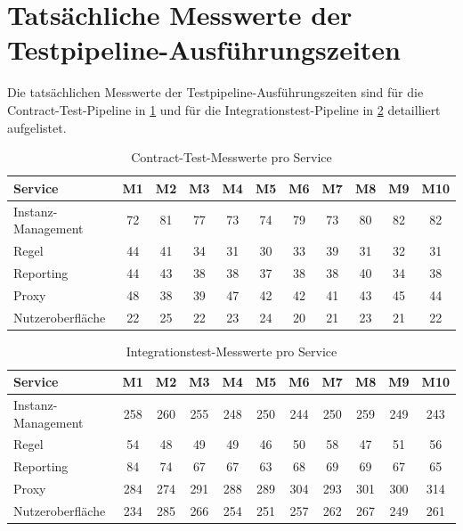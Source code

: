 \section{Tatsächliche Messwerte der Testpipeline-\-Ausführungszeiten}\label{sec:app:test-pipeline-execution-times}

Die tatsächlichen Messwerte der Testpipeline-Ausführungszeiten sind für die Contract-Test-\gls{Pipeline} in \cref{tab:contract_measurements} und für die Integrationstest-\gls{Pipeline} in \cref{tab:integration_measurements} detailliert aufgelistet.

\begin{table}[ht]
    \centering
    \caption{Contract-Test-Messwerte pro Service}
    \label{tab:contract_measurements}
    \begin{tabular}{l|cccccccccc}
        \toprule
        Service & M1 & M2 & M3 & M4 & M5 & M6 & M7 & M8 & M9 & M10 \\
        \midrule
        Instanz-Management & 72 & 81 & 77 & 73 & 74 & 79 & 73 & 80 & 82 & 82 \\
        Regel & 44 & 41 & 34 & 31 & 30 & 33 & 39 & 31 & 32 & 31 \\
        Reporting & 44 & 43 & 38 & 38 & 37 & 38 & 38 & 40 & 34 & 38 \\
        Proxy & 48 & 38 & 39 & 47 & 42 & 42 & 41 & 43 & 45 & 44 \\
        Nutzeroberfläche & 22 & 25 & 22 & 23 & 24 & 20 & 21 & 23 & 21 & 22 \\
        \bottomrule
    \end{tabular}
\end{table}

\begin{table}[ht]
    \centering
    \caption{Integrationstest-Messwerte pro Service}
    \label{tab:integration_measurements}
    \begin{tabular}{l|cccccccccc}
        \toprule
        Service & M1 & M2 & M3 & M4 & M5 & M6 & M7 & M8 & M9 & M10 \\
        \midrule
        Instanz-Management & 258 & 260 & 255 & 248 & 250 & 244 & 250 & 259 & 249 & 243 \\
        Regel & 54 & 48 & 49 & 49 & 46 & 50 & 58 & 47 & 51 & 56 \\
        Reporting & 84 & 74 & 67 & 67 & 63 & 68 & 69 & 69 & 67 & 65 \\
        Proxy & 284 & 274 & 291 & 288 & 289 & 304 & 293 & 301 & 300 & 314 \\
        Nutzeroberfläche & 234 & 285 & 266 & 254 & 251 & 257 & 262 & 267 & 249 & 261 \\
        \bottomrule
    \end{tabular}
\end{table}

